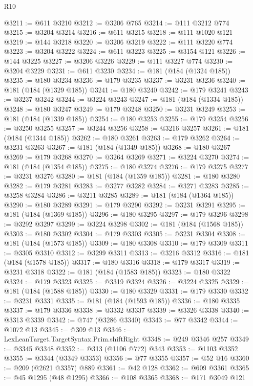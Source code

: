 \begin{lexlean}{R10}
\begin{coremodule}
{{{{{{{{{{{{{{{{{{{{{{{{{{{{{{{{{{{{{{{{{{{{{{{{{{{{{{{{{{{{{{{{{{{{{{{{{{{{{{{{{{{{{{{{{{{{{{{{{{{{{{{{{{{{@3211 := @611 @3210
@3212 := @3206 @765
@3214 := @111 @3212 @774
@3215 := @3204 @3214
@3216 := @611 @3215
@3218 := @111 @1020 @121
@3219 := @144 @3218
@3220 := @3206 @3219
@3222 := @111 @3220 @774
@3223 := @3204 @3222
@3224 := @611 @3223
@3225 := @3154 @121
@3226 := @144 @3225
@3227 := @3206 @3226
@3229 := @111 @3227 @774
@3230 := @3204 @3229
@3231 := @611 @3230
@3234 := @181 (@184 (@1324 @185))
@3235 := @180 @3234
@3236 := @179 @3235
@3237 := @3231 @3236
@3240 := @181 (@184 (@1329 @185))
@3241 := @180 @3240
@3242 := @179 @3241
@3243 := @3237 @3242
@3244 := @3224 @3243
@3247 := @181 (@184 (@1334 @185))
@3248 := @180 @3247
@3249 := @179 @3248
@3250 := @3231 @3249
@3253 := @181 (@184 (@1339 @185))
@3254 := @180 @3253
@3255 := @179 @3254
@3256 := @3250 @3255
@3257 := @3244 @3256
@3258 := @3216 @3257
@3261 := @181 (@184 (@1344 @185))
@3262 := @180 @3261
@3263 := @179 @3262
@3264 := @3231 @3263
@3267 := @181 (@184 (@1349 @185))
@3268 := @180 @3267
@3269 := @179 @3268
@3270 := @3264 @3269
@3271 := @3224 @3270
@3274 := @181 (@184 (@1354 @185))
@3275 := @180 @3274
@3276 := @179 @3275
@3277 := @3231 @3276
@3280 := @181 (@184 (@1359 @185))
@3281 := @180 @3280
@3282 := @179 @3281
@3283 := @3277 @3282
@3284 := @3271 @3283
@3285 := @3258 @3284
@3286 := @3211 @3285
@3289 := @181 (@184 (@1364 @185))
@3290 := @180 @3289
@3291 := @179 @3290
@3292 := @3231 @3291
@3295 := @181 (@184 (@1369 @185))
@3296 := @180 @3295
@3297 := @179 @3296
@3298 := @3292 @3297
@3299 := @3224 @3298
@3302 := @181 (@184 (@1568 @185))
@3303 := @180 @3302
@3304 := @179 @3303
@3305 := @3231 @3304
@3308 := @181 (@184 (@1573 @185))
@3309 := @180 @3308
@3310 := @179 @3309
@3311 := @3305 @3310
@3312 := @3299 @3311
@3313 := @3216 @3312
@3316 := @181 (@184 (@1578 @185))
@3317 := @180 @3316
@3318 := @179 @3317
@3319 := @3231 @3318
@3322 := @181 (@184 (@1583 @185))
@3323 := @180 @3322
@3324 := @179 @3323
@3325 := @3319 @3324
@3326 := @3224 @3325
@3329 := @181 (@184 (@1588 @185))
@3330 := @180 @3329
@3331 := @179 @3330
@3332 := @3231 @3331
@3335 := @181 (@184 (@1593 @185))
@3336 := @180 @3335
@3337 := @179 @3336
@3338 := @3332 @3337
@3339 := @3326 @3338
@3340 := @3313 @3339
@3342 := @747 (@3286 @3340)
@3343 := @77 @3342
@3344 := @1072 @13
@3345 := @309 @13
@3346 := LexLeanTarget.TargetSyntax.Prim.shiftRight
@3348 := @249 @3346 @257
@3349 := @3345 @3348
@3352 := @313 (@1106 @772) @343
@3353 := @1103 @3352
@3355 := @3344 (@3349 @3353)
@3356 := @77 @3355
@3357 := @52 @16
@3360 := @209 (@2621 @3357) @889
@3361 := @42 @128
@3362 := @609 @3361
@3365 := @45 @1295 (@48 @1295)
@3366 := @108 @3365
@3368 := @171 @3049 @121
}}}}}}}}}}}}}}}}}}}}}}}}}}}}}}}}}}}}}}}}}}}}}}}}}}}}}}}}}}}}}}}}}}}}}}}}}}}}}}}}}}}}}}}}}}}}}}}}}}}}}}}}}}}}
\end{coremodule}
\end{lexlean}
